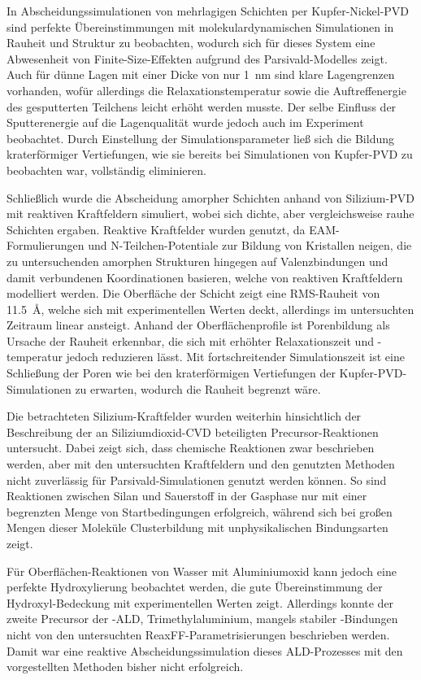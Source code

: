 In Abscheidungssimulationen von mehrlagigen Schichten per Kupfer-Nickel-PVD sind perfekte Übereinstimmungen mit molekulardynamischen Simulationen in Rauheit und Struktur zu beobachten, wodurch sich für dieses System eine Abwesenheit von Finite-Size-Effekten aufgrund des Parsivald-Modelles zeigt.
Auch für dünne Lagen mit einer Dicke von nur \SI{1}{\nano\meter} sind klare Lagengrenzen vorhanden, wofür allerdings die Relaxationstemperatur sowie die Auftreffenergie des gesputterten Teilchens leicht erhöht werden musste.
Der selbe Einfluss der Sputterenergie auf die Lagenqualität wurde jedoch auch im Experiment beobachtet.
Durch Einstellung der Simulationsparameter ließ sich die Bildung kraterförmiger Vertiefungen, wie sie bereits bei Simulationen von Kupfer-PVD zu beobachten war, vollständig eliminieren.

Schließlich wurde die Abscheidung amorpher Schichten anhand von Silizium-PVD mit reaktiven Kraftfeldern simuliert, wobei sich dichte, aber vergleichsweise rauhe Schichten ergaben.
Reaktive Kraftfelder wurden genutzt, da EAM-Formulierungen und N-Teilchen-Potentiale zur Bildung von Kristallen neigen, die zu untersuchenden amorphen Strukturen hingegen auf Valenzbindungen und damit verbundenen Koordinationen basieren, welche von reaktiven Kraftfeldern modelliert werden.
Die Oberfläche der Schicht zeigt eine RMS-Rauheit von \SI{11.5}{\angstrom}, welche sich mit experimentellen Werten deckt, allerdings im untersuchten Zeitraum linear ansteigt.
Anhand der Oberflächenprofile ist Porenbildung als Ursache der Rauheit erkennbar, die sich mit erhöhter Relaxationszeit und -temperatur jedoch reduzieren lässt.
Mit fortschreitender Simulationszeit ist eine Schließung der Poren wie bei den kraterförmigen Vertiefungen der Kupfer-PVD-Simulationen zu erwarten, wodurch die Rauheit begrenzt wäre.


Die betrachteten Silizium-Kraftfelder wurden weiterhin hinsichtlich der Beschreibung der an Siliziumdioxid-CVD beteiligten Precursor-Reaktionen untersucht.
Dabei zeigt sich, dass chemische Reaktionen zwar beschrieben werden, aber mit den untersuchten Kraftfeldern und den genutzten Methoden nicht zuverlässig für Parsivald-Simulationen genutzt werden können.
So sind Reaktionen zwischen Silan und Sauerstoff in der Gasphase nur mit einer begrenzten Menge von Startbedingungen erfolgreich, während sich bei großen Mengen dieser Moleküle Clusterbildung mit unphysikalischen Bindungsarten zeigt.

Für Oberflächen-Reaktionen von Wasser mit Aluminiumoxid kann jedoch eine perfekte Hydroxylierung beobachtet werden, die gute Übereinstimmung der Hydroxyl-Bedeckung mit experimentellen Werten zeigt.
Allerdings konnte der zweite Precursor der -ALD, Trimethylaluminium, mangels stabiler -Bindungen nicht von den untersuchten ReaxFF-Parametrisierungen beschrieben werden.
Damit war eine reaktive Abscheidungssimulation dieses ALD-Prozesses mit den vorgestellten Methoden bisher nicht erfolgreich.

